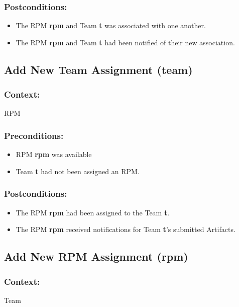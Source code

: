 \subsubsection*{Postconditions:}
\begin{itemize}
\itemsep-1.5em 
    \item The RPM \textbf{rpm} and Team \textbf{t} was associated with one another.
    \item The RPM \textbf{rpm} and Team \textbf{t} had been notified of their new association.
\end{itemize}




\subsection*{Add New Team Assignment (team)}
\subsubsection*{Context:} RPM
\subsubsection*{Preconditions:}
\begin{itemize}
\itemsep-1.5em 
    \item RPM \textbf{rpm} was available
    \item Team \textbf{t} had not been assigned an RPM.
\end{itemize}



\subsubsection*{Postconditions:}
\begin{itemize}
\itemsep-1.5em 
    \item The RPM \textbf{rpm} had been assigned to the Team \textbf{t}.
    \item The RPM  \textbf{rpm} received notifications for Team \textbf{t}’s submitted Artifacts.
\end{itemize}



\subsection*{Add New RPM Assignment (rpm)}
\subsubsection*{Context:} Team
